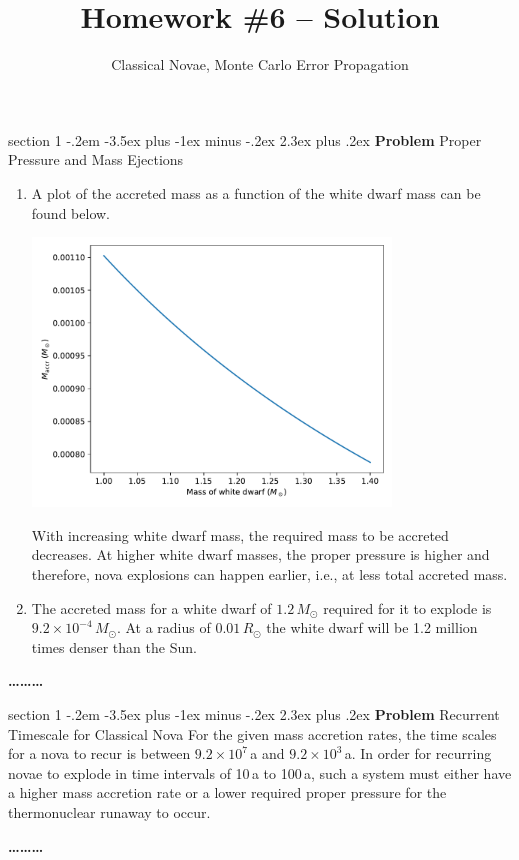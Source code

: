 \documentclass[letterpaper,12pt,twoside=false,DIV=11]{scrartcl}
\makeatletter
\newcommand{\topic}{\author}
\newenvironment{problem}{\@startsection
    {section}
    {1}
    {-.2em}
    {-3.5ex plus -1ex minus -.2ex}
    {2.3ex plus .2ex}
    {
        \pagebreak[3] %
        \noindent\sffamily\bfseries Problem
    }
}
{
    \begin{center}\large\bfseries\ldots\ldots\ldots\end{center}
}
\makeatother
\begin{document}
\title{Homework \#6 -- Solution}
\topic{Classical Novae, Monte Carlo Error Propagation}
\date{} 

\maketitle
\thispagestyle{fancy}


\begin{problem}{Proper Pressure and Mass Ejections}
\begin{enumerate}
    \item {A plot of the accreted mass as a function of the white dwarf mass can be found below.
        \begin{center}
            \includegraphics[width=0.75\textwidth]{proper_pressure_figure_1a}
        \end{center}
        With increasing white dwarf mass, the required mass to be accreted decreases. At higher white dwarf masses, the proper pressure is higher and therefore, nova explosions can happen earlier, i.e., at less total accreted mass.}
    \item {The accreted mass for a white dwarf of $1.2\,M_\odot$ required for it to explode is $9.2 \times 10^{-4}\,M_\odot$. At a radius of $0.01\,R_\odot$ the white dwarf will be 1.2 million times denser than the Sun.}
\end{enumerate}

\end{problem}

\begin{problem}{Recurrent Timescale for Classical Nova}
For the given mass accretion rates, the time scales for a nova to recur is between $9.2 \times 10^{7}$\,a and $9.2 \times 10^{3}$\,a. In order for recurring novae to explode in time intervals of 10\,a to 100\,a, such a system must either have a higher mass accretion rate or a lower required proper pressure for the thermonuclear runaway to occur.
\end{problem}
\end{document}
